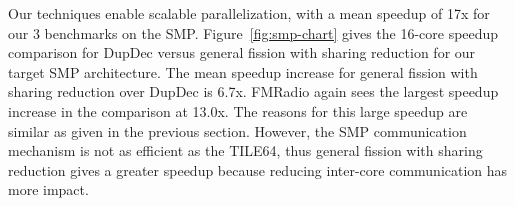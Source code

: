 Our techniques enable scalable parallelization, with a mean speedup of
17x for our 3 benchmarks on the SMP.  Figure~\ref{fig:smp-chart} gives
the 16-core speedup comparison for DupDec versus general fission with
sharing reduction for our target SMP architecture.  The mean speedup
increase for general fission with sharing reduction over DupDec is
6.7x.  FMRadio again sees the largest speedup increase in the
comparison at 13.0x.  The reasons for this large speedup are similar
as given in the previous section.  However, the SMP communication
mechanism is not as efficient as the TILE64, thus general fission with
sharing reduction gives a greater speedup because reducing inter-core
communication has more impact.
